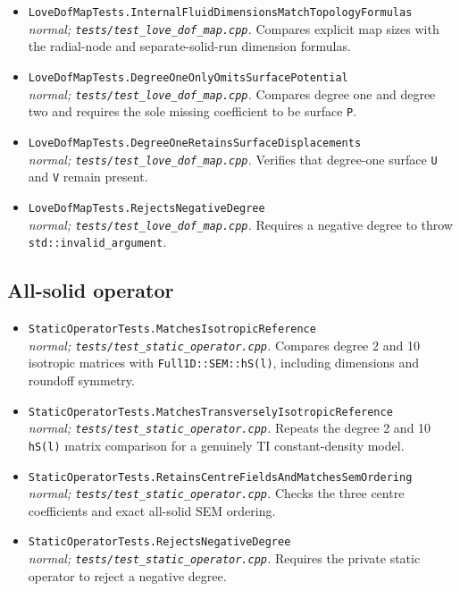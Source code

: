 \begin{itemize}[leftmargin=1.4em,itemsep=0.35em]
\emph{normal; \texttt{tests/test\_love\_dof\_map.cpp}.} Exercises both interface orientations and checks that displacement exists only on the solid side while \texttt{P} is shared.
\item {\footnotesize\texttt{LoveDofMapTests.InternalFluidDimensionsMatchTopologyFormulas}}\\
\emph{normal; \texttt{tests/test\_love\_dof\_map.cpp}.} Compares explicit map sizes with the radial-node and separate-solid-run dimension formulas.
\item {\footnotesize\texttt{LoveDofMapTests.DegreeOneOnlyOmitsSurfacePotential}}\\
\emph{normal; \texttt{tests/test\_love\_dof\_map.cpp}.} Compares degree one and degree two and requires the sole missing coefficient to be surface \texttt{P}.
\item {\footnotesize\texttt{LoveDofMapTests.DegreeOneRetainsSurfaceDisplacements}}\\
\emph{normal; \texttt{tests/test\_love\_dof\_map.cpp}.} Verifies that degree-one surface \texttt{U} and \texttt{V} remain present.
\item {\footnotesize\texttt{LoveDofMapTests.RejectsNegativeDegree}}\\
\emph{normal; \texttt{tests/test\_love\_dof\_map.cpp}.} Requires a negative degree to throw \texttt{std::invalid\_argument}.
\end{itemize}
\subsection*{All-solid operator}
\begin{itemize}[leftmargin=1.4em,itemsep=0.35em]
\item {\footnotesize\texttt{StaticOperatorTests.MatchesIsotropicReference}}\\
\emph{normal; \texttt{tests/test\_static\_operator.cpp}.} Compares degree 2 and 10 isotropic matrices with \texttt{Full1D::SEM::hS(l)}, including dimensions and roundoff symmetry.
\item {\footnotesize\texttt{StaticOperatorTests.MatchesTransverselyIsotropicReference}}\\
\emph{normal; \texttt{tests/test\_static\_operator.cpp}.} Repeats the degree 2 and 10 \texttt{hS(l)} matrix comparison for a genuinely TI constant-density model.
\item {\footnotesize\texttt{StaticOperatorTests.RetainsCentreFieldsAndMatchesSemOrdering}}\\
\emph{normal; \texttt{tests/test\_static\_operator.cpp}.} Checks the three centre coefficients and exact all-solid SEM ordering.
\item {\footnotesize\texttt{StaticOperatorTests.RejectsNegativeDegree}}\\
\emph{normal; \texttt{tests/test\_static\_operator.cpp}.} Requires the private static operator to reject a negative degree.
\end{itemize}
